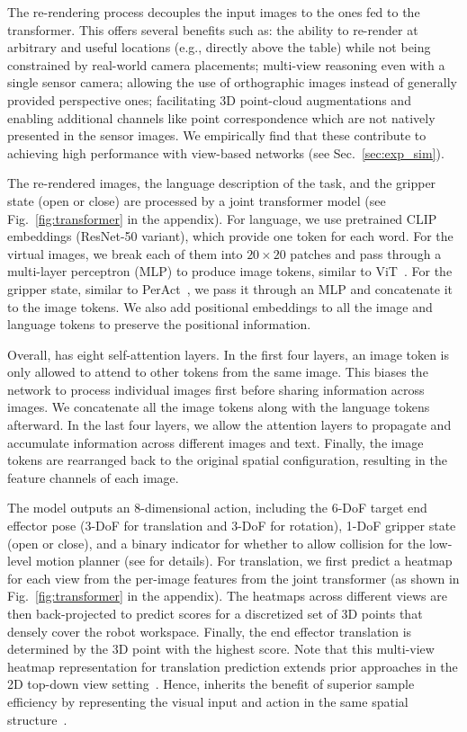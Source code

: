 The re-rendering process decouples the input images to the ones fed to the transformer. This offers several benefits such as: the ability to re-render at arbitrary and useful locations (e.g., directly above the table) while not being constrained by real-world camera placements; multi-view reasoning even with a single sensor camera; allowing the use of orthographic images instead of generally provided perspective ones; facilitating 3D point-cloud augmentations and enabling additional channels like point correspondence which are not natively presented in the sensor images. We empirically find that these contribute to achieving high performance with view-based networks (see Sec.~\ref{sec:exp_sim}). 
 
The re-rendered images, the language description of the task, and the gripper state (open or close) are processed by a joint transformer model (see Fig.~\ref{fig:transformer} in the appendix). For language, we use pretrained CLIP~\cite{radford2021learning} embeddings (ResNet-50 variant), which provide one token for each word. For the virtual images, we break each of them into $20 \times 20$ patches and pass through a multi-layer perceptron (MLP) to produce image tokens, similar to ViT~\cite{dosovitskiy2020image}. For the gripper state, similar to PerAct~\cite{peract2022arxiv}, we pass it through an MLP and concatenate it to the image tokens. We also add positional embeddings to all the image and language tokens to preserve the positional information.

Overall, \method has eight self-attention layers. In the first four layers, an image token is only allowed to attend to other tokens from the same image. This biases the network to process individual images first before sharing information across images. We concatenate all the image tokens along with the language tokens afterward. In the last four layers, we allow the attention layers to propagate and accumulate information across different images and text. Finally, the image tokens are rearranged back to the original spatial configuration, resulting in the feature channels of each image. 

 The model outputs an 8-dimensional action, including the 6-DoF target end effector pose (3-DoF for translation and 3-DoF for rotation), 1-DoF gripper state (open or close), and a binary indicator for whether to allow collision for the low-level motion planner (see \cite{peract2022arxiv} for details). For translation, we first predict a heatmap for each view from the per-image features from the joint transformer (as shown in Fig.~\ref{fig:transformer} in the appendix). The heatmaps across different views are then back-projected to predict scores for a discretized set of 3D points that densely cover the robot workspace. Finally, the end effector translation is determined by the 3D point with the highest score. Note that this multi-view heatmap representation for translation prediction extends prior approaches in the 2D top-down view setting~\cite{transporter2021}. Hence, \method inherits the benefit of superior sample efficiency by representing the visual input and action in the same spatial structure~\cite{transporter2021}. 


